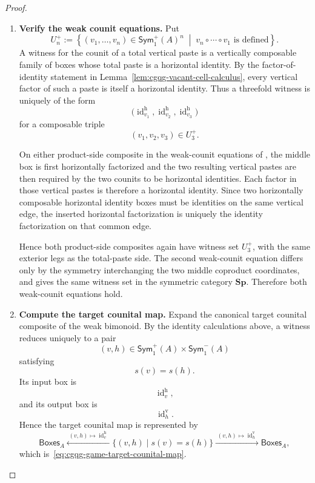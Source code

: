 \documentclass[oneside]{article}
\newcommand{\Boxes}{\mathsf{Boxes}}
\newcommand{\Sym}{\mathsf{Sym}}
\newcommand{\Sp}{\mathbf{Sp}}
\newcommand{\id}{\operatorname{id}}
\theoremstyle{plain}
\theoremstyle{definition}
\theoremstyle{remark}
\begin{document}
\begin{proof}
\begin{enumerate}[beginpenalty=10000]
        \item \textbf{Verify the weak counit equations.}
        Put
        \[
            U^+_n
            :=
            \left\{
                (v_1,\ldots,v_n)
                \in\Sym^+_1(A)^n
                \;\middle|\;
                v_n\circ\cdots\circ v_1
                \text{ is defined}
            \right\}.
        \]
        A witness for the counit of a total vertical paste is a
        vertically composable family of boxes whose total paste is a
        horizontal identity. By the factor-of-identity statement in
        Lemma~\ref{lem:cgqg-vacant-cell-calculus}, every vertical factor
        of such a paste is itself a horizontal identity. Thus a
        threefold witness is uniquely of the form
        \[
            \bigl(
                \id_{v_1}^{\mathrm h},
                \id_{v_2}^{\mathrm h},
                \id_{v_3}^{\mathrm h}
            \bigr)
        \]
        for a composable triple
        \[
            (v_1,v_2,v_3)\in U^+_3.
        \]

        On either product-side composite in the weak-counit equations of
        \cite[Def.~1.1]{PastroStreet2009}, the middle box is first
        horizontally factorized and the two resulting vertical pastes
        are then required by the two counits to be horizontal identities.
        Each factor in those vertical pastes is therefore a horizontal
        identity. Since two horizontally composable horizontal identity
        boxes must be identities on the same vertical edge, the inserted
        horizontal factorization is uniquely the identity factorization
        on that common edge.

        Hence both product-side composites again have witness set
        \(U^+_3\), with the same exterior legs as the total-paste side.
        The second weak-counit equation differs only by the symmetry
        interchanging the two middle coproduct coordinates, and gives
        the same witness set in the symmetric category \(\Sp\).
        Therefore both weak-counit equations hold.

        \item \textbf{Compute the target counital map.}
        Expand the canonical target counital composite of the weak
        bimonoid. By the identity calculations above, a witness reduces
        uniquely to a pair
        \[
            (v,h)
            \in
            \Sym^+_1(A)\times\Sym^-_1(A)
        \]
        satisfying
        \[
            s(v)=s(h).
        \]
        Its input box is
        \[
            \id_v^{\mathrm h},
        \]
        and its output box is
        \[
            \id_h^{\mathrm v}.
        \]
        Hence the target counital map is represented by
        \[
            \Boxes_A
            \xleftarrow{\;(v,h)\mapsto\id_v^{\mathrm h}\;}
            \bigl\{
                (v,h)
                \mid
                s(v)=s(h)
            \bigr\}
            \xrightarrow{\;(v,h)\mapsto\id_h^{\mathrm v}\;}
            \Boxes_A,
        \]
        which is~\eqref{eq:cgqg-game-target-counital-map}.


\end{enumerate}
\end{proof}
\end{document}
